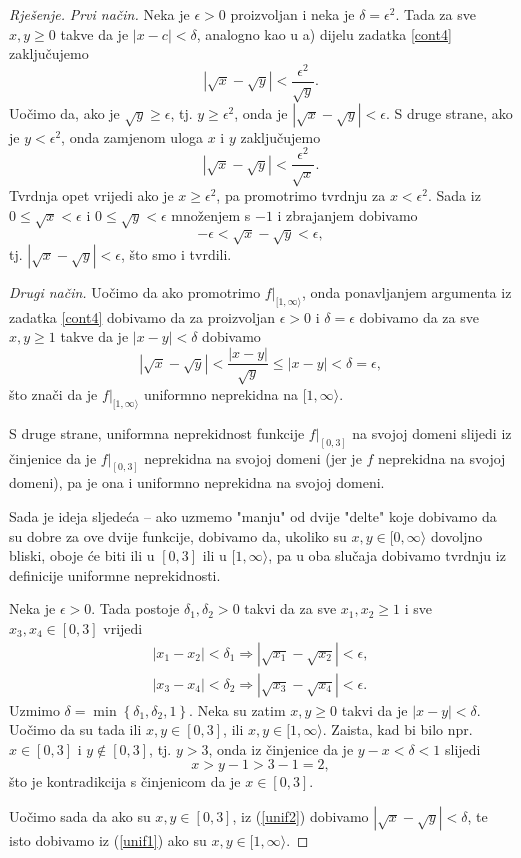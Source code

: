 \begin{proof}[Rješenje]
\textit{Prvi način.} Neka je \(\epsilon>0\) proizvoljan i neka je \(\delta=\epsilon^2\). Tada za sve \(x, y\geq 0\) takve da je \(|x-c|<\delta\), analogno kao u a) dijelu zadatka \ref{cont4} zaključujemo
\[\left\lvert \sqrt{x}-\sqrt{y}\right\rvert<\dfrac{\epsilon^2}{\sqrt{y}}.\]
Uočimo da, ako je \(\sqrt{y}\geq \epsilon\), tj. \(y\geq \epsilon^2\), onda je \(\left\lvert \sqrt{x}-\sqrt{y}\right\rvert<\epsilon\). S druge strane, ako je \(y<\epsilon^2\), onda zamjenom uloga \(x\) i \(y\) zaključujemo
\[\left\lvert \sqrt{x}-\sqrt{y}\right\rvert<\dfrac{\epsilon^2}{\sqrt{x}}.\]
Tvrdnja opet vrijedi ako je \(x\geq \epsilon^2\), pa promotrimo tvrdnju za \(x<\epsilon^2\). Sada iz \(0\leq \sqrt{x}<\epsilon\) i \(0\leq \sqrt{y}<\epsilon\) množenjem s \(-1\) i zbrajanjem dobivamo
\[-\epsilon<\sqrt{x}-\sqrt{y}<\epsilon,\]
tj. \(\left\lvert \sqrt{x}-\sqrt{y}\right\rvert<\epsilon\), što smo i tvrdili.

\textit{Drugi način.} Uočimo da ako promotrimo \(f|_{[1, \infty\rangle}\), onda ponavljanjem argumenta iz zadatka \ref{cont4} dobivamo da za proizvoljan \(\epsilon>0\) i \(\delta=\epsilon\) dobivamo da za sve \(x, y\geq 1\) takve da je \(|x-y|<\delta\) dobivamo
\[\left\lvert\sqrt{x}-\sqrt{y}\right\rvert<\dfrac{|x-y|}{\sqrt{y}}\leq |x-y|<\delta=\epsilon,\]
što znači da je \(f|_{[1, \infty\rangle}\) uniformno neprekidna na \([1, \infty\rangle\). 

S druge strane, uniformna neprekidnost funkcije \(f|_{[0, 3]}\) na svojoj domeni slijedi iz činjenice da je \(f|_{[0, 3]}\) neprekidna na svojoj domeni (jer je \(f\) neprekidna na svojoj domeni), pa je ona i uniformno neprekidna na svojoj domeni.

Sada je ideja sljedeća -- ako uzmemo "manju" od dvije "delte" koje dobivamo da su dobre za ove dvije funkcije, dobivamo da, ukoliko su \(x, y\in [0, \infty\rangle\) dovoljno bliski, oboje će biti ili u \([0, 3]\) ili u \([1, \infty\rangle\), pa u oba slučaja dobivamo tvrdnju iz definicije uniformne neprekidnosti.

Neka je \(\epsilon>0\). Tada postoje \(\delta_1, \delta_2>0\) takvi da za sve \(x_1, x_2\geq 1\) i sve \(x_3, x_4\in [0, 3]\) vrijedi
\begin{gather}
\label{unif1}
\left\lvert x_1-x_2\right\rvert<\delta_1\Rightarrow \left\lvert \sqrt{x_1}-\sqrt{x_2}\right\rvert<\epsilon,\\
\label{unif2}
\left\lvert x_3-x_4\right\rvert<\delta_2\Rightarrow \left\lvert \sqrt{x_3}-\sqrt{x_4}\right\rvert<\epsilon.
\end{gather}
Uzmimo \(\delta=\min\left\{\delta_1, \delta_2, 1\right\}\). Neka su zatim \(x, y\geq 0\) takvi da je \(|x-y|<\delta\). Uočimo da su tada ili \(x, y\in [0, 3]\), ili \(x, y\in [1,\infty\rangle\). Zaista, kad bi bilo npr. \(x\in [0, 3]\) i \(y\notin [0, 3]\), tj. \(y>3\), onda iz činjenice da je \(y-x<\delta<1\) slijedi \[x>y-1>3-1=2,\] 
što je kontradikcija s činjenicom da je \(x\in [0, 3]\).

Uočimo sada da ako su \(x, y\in [0, 3]\), iz (\ref{unif2}) dobivamo \(\left\lvert \sqrt{x}-\sqrt{y}\right\rvert<\delta\), te isto dobivamo iz (\ref{unif1}) ako su \(x, y\in [1, \infty\rangle\).
\end{proof}
